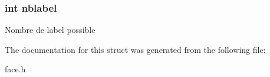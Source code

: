\subsubsection[{nblabel}]{\setlength{\rightskip}{0pt plus 5cm}int nblabel}\label{struct_face_ac9c2bd71228f143ad14ba5ba6cae2b0e}
Nombre de label possible 

The documentation for this struct was generated from the following file\+:\begin{DoxyCompactItemize}
\item 
face.\+h\end{DoxyCompactItemize}
